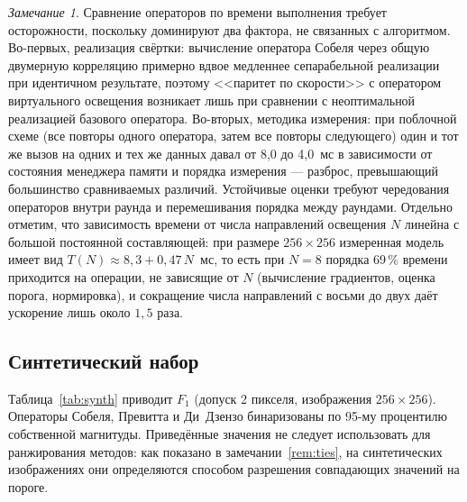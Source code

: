 \documentclass[11pt,a4paper]{article}
\theoremstyle{plain}
\theoremstyle{definition}
\theoremstyle{remark}
\newtheorem{remark}{Замечание}
\begin{document}
\begin{remark}
\label{rem:timing}
Сравнение операторов по времени выполнения требует осторожности, поскольку
доминируют два фактора, не связанных с алгоритмом. Во-первых, реализация
свёртки: вычисление оператора Собеля через общую двумерную корреляцию
примерно вдвое медленнее сепарабельной реализации при идентичном
результате, поэтому <<паритет по скорости>> с оператором виртуального
освещения возникает лишь при сравнении с неоптимальной реализацией
базового оператора. Во-вторых, методика измерения: при поблочной схеме
(все повторы одного оператора, затем все повторы следующего) один и тот же
вызов на одних и тех же данных давал от 8{,}0 до 4{,}0~мс в зависимости от
состояния менеджера памяти и порядка измерения --- разброс, превышающий
большинство сравниваемых различий. Устойчивые оценки требуют чередования
операторов внутри раунда и перемешивания порядка между раундами.
Отдельно отметим, что зависимость времени от числа направлений освещения
$N$ линейна с большой постоянной составляющей: при размере
$256\times256$ измеренная модель имеет вид
$T(N)\approx 8{,}3 + 0{,}47\,N$~мс, то есть при $N=8$ порядка 69\,\%
времени приходится на операции, не зависящие от $N$ (вычисление
градиентов, оценка порога, нормировка), и сокращение числа направлений с
восьми до двух даёт ускорение лишь около $1{,}5$ раза.
\end{remark}

\subsection{Синтетический набор}

Таблица~\ref{tab:synth} приводит $F_1$ (допуск 2 пикселя, изображения
$256\times256$). Операторы Собеля, Превитта и Ди~Дзензо бинаризованы по
95-му процентилю собственной магнитуды. Приведённые значения не следует
использовать для ранжирования методов: как показано в
замечании~\ref{rem:ties}, на синтетических изображениях они определяются
способом разрешения совпадающих значений на пороге.
\end{document}

